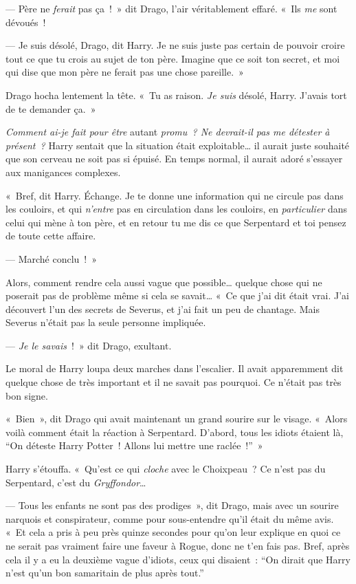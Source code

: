 --- Père ne \emph{ferait} pas ça~!~»
dit Drago, l'air véritablement effaré.
«~Ils \emph{me} sont dévoués~!

--- Je suis désolé, Drago, dit Harry.
Je ne suis juste pas certain de pouvoir croire tout ce que tu crois au sujet de ton père.
Imagine que ce soit ton secret, et moi qui dise que mon père ne ferait pas une chose pareille.~»

Drago hocha lentement la tête.
«~Tu as raison.
\emph{Je suis} désolé, Harry.
J'avais tort de te demander ça.~»

\emph{Comment ai-je fait pour être} autant \emph{promu~?
Ne devrait-il pas me détester à présent~?}
Harry sentait que la situation était exploitable… il aurait juste souhaité que son cerveau ne soit pas si épuisé.
En temps normal, il aurait adoré s'essayer aux manigances complexes.

«~Bref, dit Harry. Échange.
Je te donne une information qui ne circule pas dans les couloirs, et qui \emph{n'entre} pas en circulation dans les couloirs, en \emph{particulier} dans celui qui mène à ton père, et en retour tu me dis ce que Serpentard et toi pensez de toute cette affaire.

--- Marché conclu~!~»

Alors, comment rendre cela aussi vague que possible… quelque chose qui ne poserait pas de problème même si cela se savait…
«~Ce que j'ai dit était vrai.
J'ai découvert l'un des secrets de Severus, et j'ai fait un peu de chantage.
Mais Severus n'était pas la seule personne impliquée.

--- \emph{Je le savais}~!~» dit Drago, exultant.

Le moral de Harry loupa deux marches dans l'escalier.
Il avait apparemment dit quelque chose de très important et il ne savait pas pourquoi.
Ce n'était pas très bon signe.

«~Bien~», dit Drago qui avait maintenant un grand sourire sur le visage.
«~Alors voilà comment était la réaction à Serpentard.
D'abord, tous les idiots étaient là, “On déteste Harry Potter~!
Allons lui mettre une raclée~!”~»

Harry s'étouffa.
«~Qu'est ce qui \emph{cloche} avec le Choixpeau~?
Ce n'est pas du Serpentard, c'est du \emph{Gryffondor}…

--- Tous les enfants ne sont pas des prodiges~», dit Drago, mais avec un sourire narquois et conspirateur, comme pour sous-entendre qu'il était du même avis.
«~Et cela a pris à peu près quinze secondes pour qu'on leur explique en quoi ce ne serait pas vraiment faire une faveur à Rogue, donc ne t'en fais pas.
Bref, après cela il y a eu la deuxième vague d'idiots, ceux qui disaient~: “On dirait que Harry n'est qu'un bon samaritain de plus après tout.”

